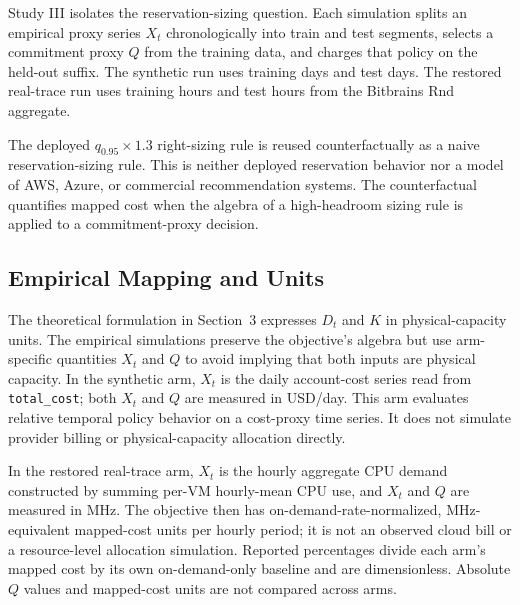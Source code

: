 \documentclass[11pt]{article}
\begin{document}
Study III isolates the reservation-sizing question. Each simulation splits an
empirical proxy series \(X_t\) chronologically into train and test segments,
selects a commitment proxy \(Q\) from the training data, and charges that
policy on the held-out suffix. The synthetic run uses \polTrainPeriods{}
training days and \polTestPeriods{} test days. The restored real-trace run
uses \extPolTrainPeriods{} training hours and \extPolTestPeriods{} test hours
from the Bitbrains Rnd aggregate.

The deployed $q_{0.95}\times1.3$ right-sizing rule is reused
counterfactually as a naive reservation-sizing rule. This is neither deployed
reservation behavior nor a model of AWS, Azure, or commercial recommendation
systems. The counterfactual quantifies mapped cost when the algebra of a
high-headroom sizing rule is applied to a commitment-proxy decision.

\subsection{Empirical Mapping and Units}

The theoretical formulation in Section~3 expresses \(D_t\) and \(K\) in
physical-capacity units. The empirical simulations preserve the objective's
algebra but use arm-specific quantities \(X_t\) and \(Q\) to avoid implying
that both inputs are physical capacity. In the synthetic arm, \(X_t\) is the
daily account-cost series read from \texttt{total\_cost}; both \(X_t\) and
\(Q\) are measured in USD/day. This arm evaluates relative temporal policy
behavior on a cost-proxy time series. It does not simulate provider billing or
physical-capacity allocation directly.

In the restored real-trace arm, \(X_t\) is the hourly aggregate CPU demand
constructed by summing per-VM hourly-mean CPU use, and \(X_t\) and \(Q\) are
measured in MHz. The objective then has on-demand-rate-normalized,
MHz-equivalent mapped-cost units per hourly period; it is not an observed
cloud bill or a resource-level allocation simulation. Reported percentages
divide each arm's mapped cost by its own on-demand-only baseline and are
dimensionless. Absolute \(Q\) values and mapped-cost units are not compared
across arms.
\end{document}
